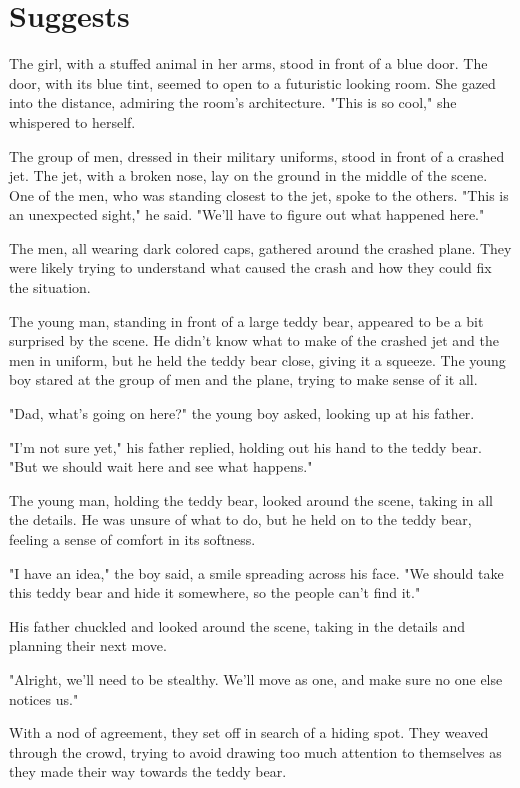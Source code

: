\documentclass[smalldemyvopaper,11pt,twoside,onecolumn,openright,extrafontsizes]{memoir}
\begin{document}
\chapter{Suggests}
The girl, with a stuffed animal in her arms, stood in front of a blue door. The door, with its blue tint, seemed to open to a futuristic looking room. She gazed into the distance, admiring the room's architecture. "This is so cool," she whispered to herself.\par
The group of men, dressed in their military uniforms, stood in front of a crashed jet. The jet, with a broken nose, lay on the ground in the middle of the scene. One of the men, who was standing closest to the jet, spoke to the others. "This is an unexpected sight," he said. "We'll have to figure out what happened here."\par
The men, all wearing dark colored caps, gathered around the crashed plane. They were likely trying to understand what caused the crash and how they could fix the situation.\par
The young man, standing in front of a large teddy bear, appeared to be a bit surprised by the scene. He didn't know what to make of the crashed jet and the men in uniform, but he held the teddy bear close, giving it a squeeze. The young boy stared at the group of men and the plane, trying to make sense of it all.\par
"Dad, what's going on here?" the young boy asked, looking up at his father.\par
"I'm not sure yet," his father replied, holding out his hand to the teddy bear. "But we should wait here and see what happens."\par
The young man, holding the teddy bear, looked around the scene, taking in all the details. He was unsure of what to do, but he held on to the teddy bear, feeling a sense of comfort in its softness.\par
"I have an idea," the boy said, a smile spreading across his face. "We should take this teddy bear and hide it somewhere, so the people can't find it."\par
His father chuckled and looked around the scene, taking in the details and planning their next move.\par
"Alright, we'll need to be stealthy. We'll move as one, and make sure no one else notices us."\par
With a nod of agreement, they set off in search of a hiding spot. They weaved through the crowd, trying to avoid drawing too much attention to themselves as they made their way towards the teddy bear.\par
\end{document}
